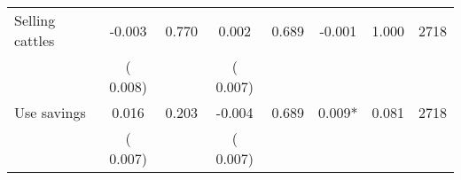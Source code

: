 \begin{tabular}{l*{7}{c}}
 Selling cattles       &             -0.003       &        0.770  &              0.002       &        0.689  &             -0.001       &              1.000 &  2718 \\ 
                       &       (       0.008)             &                               &       (       0.007)                     &                               &                                               &                                &                      \\ 

 Use savings       &              0.016       &        0.203  &             -0.004       &        0.689  &              0.009*       &              0.081 &  2718 \\ 
                       &       (       0.007)             &                               &       (       0.007)                     &                               &                                               &                                &                      \\ 

\hline \end{tabular}